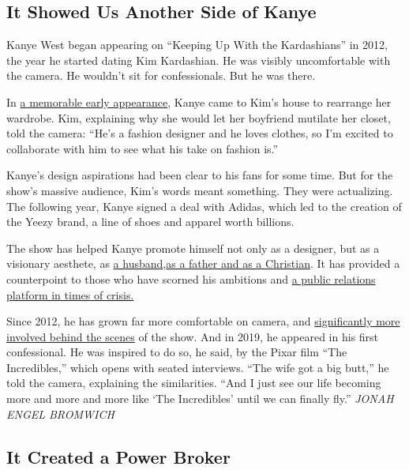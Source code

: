 \hypertarget{it-showed-us-another-side-of-kanye}{%
\subsection{It Showed Us Another Side of
Kanye}\label{it-showed-us-another-side-of-kanye}}

Kanye West began appearing on ``Keeping Up With the Kardashians'' in
2012, the year he started dating Kim Kardashian. He was visibly
uncomfortable with the camera. He wouldn't sit for confessionals. But he
was there.

In \href{https://www.youtube.com/watch?v=8E9lNF9bhYU}{a memorable early
appearance}, Kanye came to Kim's house to rearrange her wardrobe. Kim,
explaining why she would let her boyfriend mutilate her closet, told the
camera: ``He's a fashion designer and he loves clothes, so I'm excited
to collaborate with him to see what his take on fashion is.''

Kanye's design aspirations had been clear to his fans for some time. But
for the show's massive audience, Kim's words meant something. They were
actualizing. The following year, Kanye signed a deal with Adidas, which
led to the creation of the Yeezy brand, a line of shoes and apparel
worth billions.

The show has helped Kanye promote himself not only as a designer, but as
a visionary aesthete, as
\href{https://www.youtube.com/watch?v=d93rqA0qzQ0}{a
husband},\href{https://www.youtube.com/watch?v=y-FjjvkbP2g}{as a father
and as a Christian}. It has provided a counterpoint to those who have
scorned his ambitions and
\href{https://www.youtube.com/watch?v=W6dgqgoSDFY\&ab_channel=E\%21Entertainment}{a
public relations platform in times of crisis.}

Since 2012, he has grown far more comfortable on camera, and
\href{https://www.nytimes3xbfgragh.onion/2019/03/30/style/kardashians-interview.html}{significantly
more involved behind the scenes} of the show. And in 2019, he appeared
in his first confessional. He was inspired to do so, he said, by the
Pixar film ``The Incredibles,'' which opens with seated interviews.
``The wife got a big butt,'' he told the camera, explaining the
similarities. ``And I just see our life becoming more and more and more
like `The Incredibles' until we can finally fly.'' \emph{JONAH ENGEL
BROMWICH}

\hypertarget{it-created-a-power-broker}{%
\subsection{It Created a Power Broker}\label{it-created-a-power-broker}}

